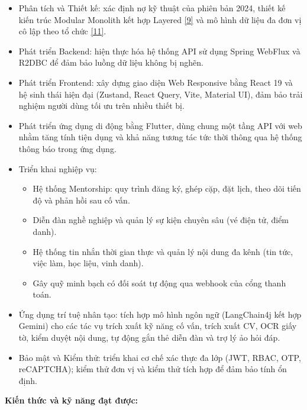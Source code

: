 \documentclass[12pt,a4paper]{article}
\begin{document}
\begin{itemize}
    \item Phân tích và Thiết kế: xác định nợ kỹ thuật của phiên bản 2024, thiết kế kiến trúc Modular Monolith kết hợp Layered \hyperref[ref:poeaa]{[9]} và mô hình dữ liệu đa đơn vị cô lập theo tổ chức \hyperref[ref:multitenant]{[11]}.
    \item Phát triển Backend: hiện thực hóa hệ thống API sử dụng Spring WebFlux và R2DBC để đảm bảo luồng dữ liệu không bị nghẽn.
    \item Phát triển Frontend: xây dựng giao diện Web Responsive bằng React 19 và hệ sinh thái hiện đại (Zustand, React Query, Vite, Material UI), đảm bảo trải nghiệm người dùng tối ưu trên nhiều thiết bị.
    \item Phát triển ứng dụng di động bằng Flutter, dùng chung một tầng API với web nhằm tăng tính tiện dụng và khả năng tương tác tức thời thông qua hệ thống thông báo trong ứng dụng.
    \item Triển khai nghiệp vụ:
    \begin{itemize}
        \item Hệ thống Mentorship: quy trình đăng ký, ghép cặp, đặt lịch, theo dõi tiến độ và phản hồi sau cố vấn.
        \item Diễn đàn nghề nghiệp và quản lý sự kiện chuyên sâu (vé điện tử, điểm danh).
        \item Hệ thống tin nhắn thời gian thực và quản lý nội dung đa kênh (tin tức, việc làm, học liệu, vinh danh).
        \item Gây quỹ minh bạch có đối soát tự động qua webhook của cổng thanh toán.
    \end{itemize}
    \item Ứng dụng trí tuệ nhân tạo: tích hợp mô hình ngôn ngữ (LangChain4j kết hợp Gemini) cho các tác vụ trích xuất kỹ năng cố vấn, trích xuất CV, OCR giấy tờ, kiểm duyệt nội dung, tự động gắn thẻ diễn đàn và trợ lý ảo hỏi đáp.
    \item Bảo mật và Kiểm thử: triển khai cơ chế xác thực đa lớp (JWT, RBAC, OTP, reCAPTCHA); kiểm thử đơn vị và kiểm thử tích hợp để đảm bảo tính ổn định.
\end{itemize}
\textbf{Kiến thức và kỹ năng đạt được:}
\vspace{-8pt}
\end{document}

